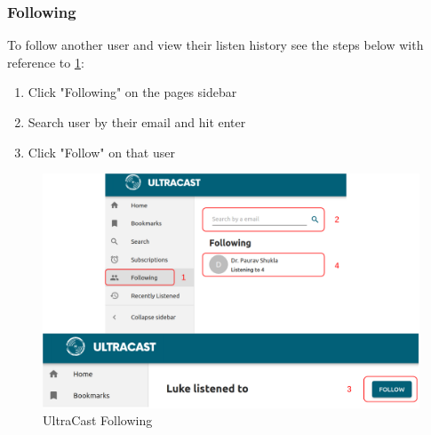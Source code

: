 \documentclass[../report.tex]{subfiles}
\begin{document}
\subsubsection{Following}
To follow another user and view their listen history see the steps below with reference to \cref{fig:UM_following}:
\begin{enumerate}
    \item Click "Following" on the pages sidebar
    \item Search user by their email and hit enter
    \item Click "Follow" on that user
\end{enumerate}
\begin{figure}[ht]
    \centering
    \includegraphics[width=16cm]{resources/UM_Follow}
    \caption{UltraCast Following}
    \label{fig:UM_following} 
\end{figure}
\end{document}
